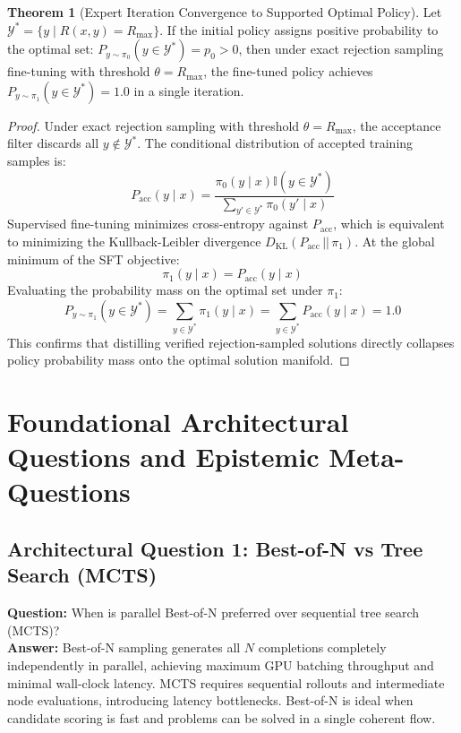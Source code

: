 \documentclass[11pt,a4paper]{article}
\theoremstyle{definition}
\newtheorem{theorem}{\textbf{Theorem}}[section]
\begin{document}
\begin{theorem}[Expert Iteration Convergence to Supported Optimal Policy]
Let $\mathcal{Y}^* = \{y \mid R(x, y) = R_{\max}\}$. If the initial policy assigns positive probability to the optimal set: $P_{y \sim \pi_0}(y \in \mathcal{Y}^*) = p_0 > 0$, then under exact rejection sampling fine-tuning with threshold $\theta = R_{\max}$, the fine-tuned policy achieves $P_{y \sim \pi_1}(y \in \mathcal{Y}^*) = 1.0$ in a single iteration.
\end{theorem}

\begin{proof}
Under exact rejection sampling with threshold $\theta = R_{\max}$, the acceptance filter discards all $y \notin \mathcal{Y}^*$.
The conditional distribution of accepted training samples is:
{\boldmath
\begin{equation}
P_{\text{acc}}(y \mid x) = \frac{\pi_0(y \mid x) \mathbb{I}(y \in \mathcal{Y}^*)}{\sum_{y' \in \mathcal{Y}^*} \pi_0(y' \mid x)}
\end{equation}
}
Supervised fine-tuning minimizes cross-entropy against $P_{\text{acc}}$, which is equivalent to minimizing the Kullback-Leibler divergence $D_{\text{KL}}(P_{\text{acc}} \,||\, \pi_1)$.
At the global minimum of the SFT objective:
{\boldmath
\begin{equation}
\pi_1(y \mid x) = P_{\text{acc}}(y \mid x)
\end{equation}
}
Evaluating the probability mass on the optimal set under $\pi_1$:
{\boldmath
\begin{equation}
P_{y \sim \pi_1}(y \in \mathcal{Y}^*) = \sum_{y \in \mathcal{Y}^*} \pi_1(y \mid x) = \sum_{y \in \mathcal{Y}^*} P_{\text{acc}}(y \mid x) = 1.0
\end{equation}
}
This confirms that distilling verified rejection-sampled solutions directly collapses policy probability mass onto the optimal solution manifold.
\end{proof}

\section{Foundational Architectural Questions and Epistemic Meta-Questions}

\subsection{Architectural Question 1: Best-of-N vs Tree Search (MCTS)}
\textbf{Question:} When is parallel Best-of-N preferred over sequential tree search (MCTS)?\\
\textbf{Answer:} Best-of-N sampling generates all $N$ completions completely independently in parallel, achieving maximum GPU batching throughput and minimal wall-clock latency. MCTS requires sequential rollouts and intermediate node evaluations, introducing latency bottlenecks. Best-of-N is ideal when candidate scoring is fast and problems can be solved in a single coherent flow.
\end{document}
